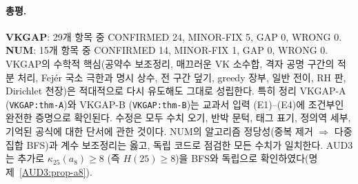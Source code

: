 \paragraph{총평.}
\textbf{VKGAP}: 29개 항목 중 CONFIRMED 24, MINOR-FIX 5, GAP 0, WRONG 0.
\textbf{NUM}: 15개 항목 중 CONFIRMED 14, MINOR-FIX 1, GAP 0, WRONG 0.
VKGAP의 수학적 핵심(공약수 보조정리, 매끄러운 VK 소수합, 격자 공명 구간의 적분 처리, Fejér 국소 극한과 명시 상수, 전 구간 덮기, greedy 장부, 일반 전이, RH 판, Dirichlet 천장)은
적대적으로 다시 유도해도 그대로 성립한다. 특히 정리 VKGAP-A (\texttt{VKGAP:thm-A})와 VKGAP-B (\texttt{VKGAP:thm-B})는 교과서 입력 (E1)--(E4)에 조건부인 완전한 증명으로 확인된다.
수정은 모두 수치 오기, 반박 문턱, 태그 표기, 정의역 세부, 기억된 공식에 대한 단서에 관한 것이다.
NUM의 알고리즘 정당성(중복 제거 $\Rightarrow$ 다중집합 BFS)과 계수 보조정리는 옳고, 독립 코드로 점검한 모든 수치가 일치한다.
AUD3는 추가로 $\kappa_{25}(a_8)\ge8$ (즉 $H(25)\ge8$)을 BFS와 독립으로 확인하였다(명제~\ref{AUD3:prop-a8}).

